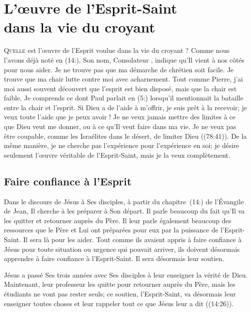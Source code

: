\chapter[L'\oe{}uvre de l'Esprit-Saint dans la vie du croyant]{L'\oe{}uvre de l'Esprit-Saint\\ dans la vie du croyant}
\renewcommand{\chaphead}{\textls[0]{L'\oe{}uvre de l'Esprit-Saint dans la vie du croyant}}

\lettrine{Q}{uelle} est l'œuvre de l'Esprit
 voulue dans la vie du croyant ?
 Comme nous l'avons déjà noté en (14:), Son nom,
 \Og Con\-so\-la\-teur \Fg{}, indique qu'Il vient à nos côtés pour nous aider.
 Je ne trouve pas que ma démarche de chrétien soit facile.
 Je trouve que ma chair lutte contre moi avec acharnement.
 Tout comme Pierre, j'ai moi aussi souvent découvert que l'esprit
 est bien disposé, mais que la chair est faible.
 Je comprends ce dont Paul parlait en (5:) lorsqu'il
 mentionnait la bataille entre la chair et l'esprit.
 Si Dieu a de l'aide à m'offrir, je suis prêt à la recevoir;
 je veux toute l'aide que je peux avoir !
 Je ne veux jamais mettre des limites à ce que Dieu veut me donner,
 ou à ce qu'Il veut faire dans ma vie. Je ne veux pas être coupable,
 comme les Israélites dans le désert,
 de limiter Dieu ((78:41)).
 De la même manière, je ne cherche pas l'expérience 
 pour l'expérience en soi; je désire seulement l'œuvre véritable
 de l'Esprit-Saint, mais je la veux complètement.

\section{Faire confiance \`a l'Esprit}

Dans le discours de Jésus à Ses disciples, à partir du chapitre~(14:)
 de l'Évangile de Jean, Il cherche à les préparer à Son départ.
 Il parle beaucoup du fait qu'Il va les quitter et retourner auprès du Père.
 Il leur parle également beaucoup des ressources que le Père et Lui
 ont préparées pour eux par la puissance de l'Esprit-Saint.
 Il sera là pour les aider. Tout comme ils avaient appris à faire confiance
 à Jésus pour toute situation ou urgence qui pouvait arriver,
 ils doivent désormais apprendre à faire confiance à l'Esprit-Saint.
 Il sera désormais leur soutien.

Jésus a passé Ses trois années avec Ses disciples à leur enseigner
 la vérité de Dieu. Maintenant, leur professeur les quitte pour retourner
 auprès du Père, mais les étudiants ne vont pas rester seuls;
 ce soutien, l'Esprit-Saint, va désormais leur enseigner toutes choses
 et leur rappeler tout ce que Jésus leur a dit
 ((14:26)).

